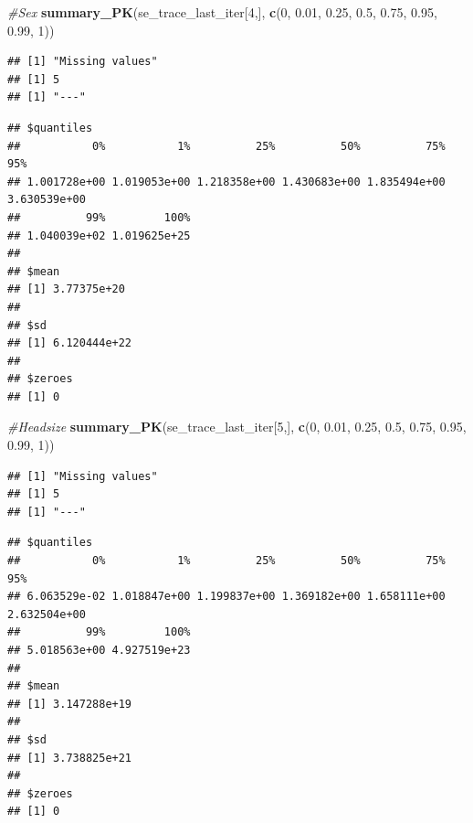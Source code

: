\documentclass[]{article}
\newenvironment{Shaded}{\begin{snugshade}}{\end{snugshade}}
\newcommand{\CommentTok}[1]{\textcolor[rgb]{0.56,0.35,0.01}{\textit{#1}}}
\newcommand{\DecValTok}[1]{\textcolor[rgb]{0.00,0.00,0.81}{#1}}
\newcommand{\FloatTok}[1]{\textcolor[rgb]{0.00,0.00,0.81}{#1}}
\newcommand{\KeywordTok}[1]{\textcolor[rgb]{0.13,0.29,0.53}{\textbf{#1}}}
\newcommand{\NormalTok}[1]{#1}
\begin{document}
\begin{Shaded}
\begin{Highlighting}[]
\CommentTok{#Sex}
\KeywordTok{summary_PK}\NormalTok{(se_trace_last_iter[}\DecValTok{4}\NormalTok{,], }\KeywordTok{c}\NormalTok{(}\DecValTok{0}\NormalTok{, }\FloatTok{0.01}\NormalTok{, }\FloatTok{0.25}\NormalTok{, }\FloatTok{0.5}\NormalTok{, }\FloatTok{0.75}\NormalTok{, }\FloatTok{0.95}\NormalTok{, }\FloatTok{0.99}\NormalTok{, }\DecValTok{1}\NormalTok{))}
\end{Highlighting}
\end{Shaded}

\begin{verbatim}
## [1] "Missing values"
## [1] 5
## [1] "---"
\end{verbatim}

\begin{verbatim}
## $quantiles
##           0%           1%          25%          50%          75%          95% 
## 1.001728e+00 1.019053e+00 1.218358e+00 1.430683e+00 1.835494e+00 3.630539e+00 
##          99%         100% 
## 1.040039e+02 1.019625e+25 
## 
## $mean
## [1] 3.77375e+20
## 
## $sd
## [1] 6.120444e+22
## 
## $zeroes
## [1] 0
\end{verbatim}

\begin{Shaded}
\begin{Highlighting}[]
\CommentTok{#Headsize}
\KeywordTok{summary_PK}\NormalTok{(se_trace_last_iter[}\DecValTok{5}\NormalTok{,], }\KeywordTok{c}\NormalTok{(}\DecValTok{0}\NormalTok{, }\FloatTok{0.01}\NormalTok{, }\FloatTok{0.25}\NormalTok{, }\FloatTok{0.5}\NormalTok{, }\FloatTok{0.75}\NormalTok{, }\FloatTok{0.95}\NormalTok{, }\FloatTok{0.99}\NormalTok{, }\DecValTok{1}\NormalTok{))}
\end{Highlighting}
\end{Shaded}

\begin{verbatim}
## [1] "Missing values"
## [1] 5
## [1] "---"
\end{verbatim}

\begin{verbatim}
## $quantiles
##           0%           1%          25%          50%          75%          95% 
## 6.063529e-02 1.018847e+00 1.199837e+00 1.369182e+00 1.658111e+00 2.632504e+00 
##          99%         100% 
## 5.018563e+00 4.927519e+23 
## 
## $mean
## [1] 3.147288e+19
## 
## $sd
## [1] 3.738825e+21
## 
## $zeroes
## [1] 0
\end{verbatim}
\end{document}

